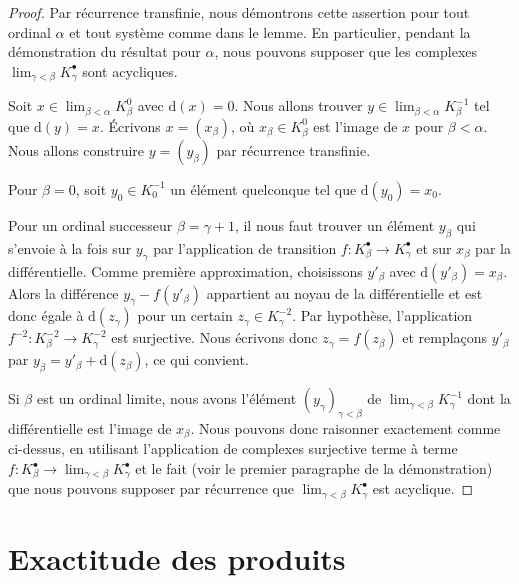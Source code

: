 \begin{proof}
Par récurrence transfinie, nous démontrons cette assertion pour tout ordinal
$\alpha$ et tout système comme dans le lemme. En particulier, pendant la
démonstration du résultat pour $\alpha$, nous pouvons supposer que les
complexes $\lim_{\gamma < \beta} K^\bullet_\gamma$ sont acycliques.

\medskip\noindent
Soit $x \in \lim_{\beta < \alpha} K^0_\beta$ avec $\text{d}(x) = 0$.
Nous allons trouver $y \in \lim_{\beta < \alpha} K^{-1}_\beta$
tel que $\text{d}(y) = x$.
Écrivons $x = (x_\beta)$, où $x_\beta \in K_\beta^0$ est l'image de $x$
pour $\beta < \alpha$. Nous allons construire $y = (y_\beta)$
par récurrence transfinie.

\medskip\noindent
Pour $\beta = 0$, soit $y_0 \in K_0^{-1}$
un élément quelconque tel que $\text{d}(y_0) = x_0$.

\medskip\noindent
Pour un ordinal successeur $\beta = \gamma + 1$, il nous faut trouver un
élément $y_\beta$ qui s'envoie à la fois sur $y_\gamma$ par l'application de
transition $f : K^\bullet_\beta \to K^\bullet_\gamma$ et sur $x_\beta$ par
la différentielle. Comme première approximation, choisissons $y'_\beta$ avec
$\text{d}(y'_\beta) = x_\beta$. Alors la différence
$y_\gamma - f(y'_\beta)$ appartient au noyau de la différentielle et est donc
égale à $\text{d}(z_\gamma)$ pour un certain $z_\gamma \in K^{-2}_\gamma$.
Par hypothèse, l'application $f^{-2} : K^{-2}_\beta \to K^{-2}_\gamma$
est surjective. Nous écrivons donc $z_\gamma = f(z_\beta)$
et remplaçons $y'_\beta$ par
$y_\beta = y'_\beta + \text{d}(z_\beta)$, ce qui convient.

\medskip\noindent
Si $\beta$ est un ordinal limite, nous avons l'élément
$(y_\gamma)_{\gamma < \beta}$ de $\lim_{\gamma < \beta} K^{-1}_\gamma$
dont la différentielle est l'image de $x_\beta$. Nous pouvons donc raisonner
exactement comme ci-dessus, en utilisant l'application de complexes
surjective terme à terme
$f : K_\beta^\bullet \to \lim_{\gamma < \beta} K_\gamma^\bullet$
et le fait (voir le premier paragraphe de la démonstration) que nous pouvons
supposer par récurrence que
$\lim_{\gamma < \beta} K_\gamma^\bullet$ est acyclique.
\end{proof}

\section{Exactitude des produits}
\label{section-product-exact}


